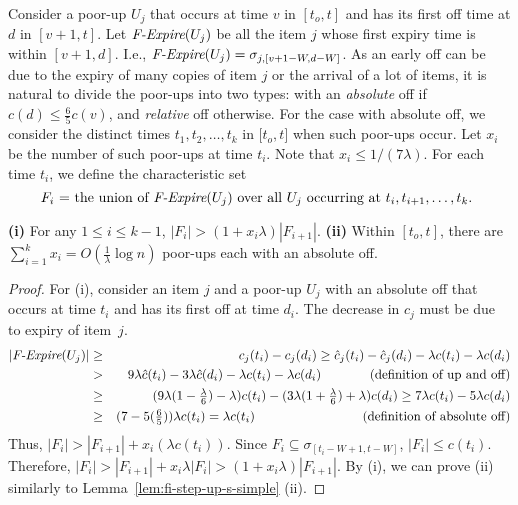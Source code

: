 \documentclass[proceedings]{stacs}
\theoremstyle{definition}\newtheorem{fact}{Fact}
\newcommand{\eif}{\mbox{\it F-Expire}}
\newcommand{\ns}{c}
\newcommand{\hns}{\hat c}
\newcommand{\cjs}{c_{j}}
\newcommand{\hcjs}{\hat c_{j}}
\begin{document}
\vspace{.5ex}
Consider a poor-up $U_j$ that occurs at time $v$ in $[t_o, t]$
and has its first off time at $d$ in $[v+1,t]$.
Let $\eif(U_j)$ be all the item $j$ whose first expiry time is
within $[v+1, d]$.  I.e.,  $\eif(U_j) = \sigma_{j,[v+1 - W, d -W]}$.
As an early off can be due to the expiry of many copies of item $j$
or the arrival of a lot of items, it is natural to divide
the poor-ups into two types:  with an \emph{absolute} off if
$\ns(d) \le \frac{6}{5} \ns(v)$, and \emph{relative} off otherwise.
For the case with absolute off, we consider
the distinct times $t_1, t_2, \dots, t_k$ in $[t_o, t$]
when such poor-ups occur.
Let $x_i$ be the number of such poor-ups at time $t_i$.
Note that $x_i \le 1 / (7 \lambda)$.
For each time $t_i$,
we define the characteristic set
$$\mbox{$F_i$ =  the union of
$\eif(U_j)$ over all $U_j$ occurring at $t_i, t_{i+1}, \dots, t_k$.
}
$$

\begin{lemma} \label{lem:fi-poor-up-s}
{\bf (i)}
For any $1 \le i \le k-1$, $|F_{i}| > (1 + x_i \lambda) |F_{i+1}|$.
{\bf (ii)}
Within $[t_o, t]$, there are $\sum_{i=1}^{k} x_i = O(
\frac{1}{\lambda} \log n )$
poor-ups each with an absolute off.
\end{lemma}

\begin{proof}
For (i),
consider an item $j$ and a poor-up $U_j$ with an absolute off that occurs at time $t_i$
and has its first off at time $d_i$.
The decrease in $\cjs$ must be due to expiry of item~$j$.
\begin{eqnarray*}
|\eif(U_j)|
& \ge & \cjs(t_i) - \cjs(d_i)
\ge \hcjs(t_i) - \hcjs(d_i) - \lambda \ns(t_i) - \lambda \ns(d_i) \\
& > & 9 \lambda \hns(t_i) - 3 \lambda \hns(d_i) - \lambda \ns(t_i) - \lambda \ns(d_i)
\hspace{.52in}\mbox{(definition of up and off)}\\
& \ge & \textstyle(9 \lambda (1 - \frac{\lambda}{6}) - \lambda)\ns(t_i)
- (3 \lambda(1 + \frac{\lambda}{6}) + \lambda) \ns(d_i)
\ge 7 \lambda \ns(t_i) - 5 \lambda \ns(d_i) \\
& \ge & \textstyle (7  - 5 (\frac{6}{5}) )\lambda \ns(t_i) = \lambda \ns(t_i)
\hspace{1.15in}\mbox{(definition of absolute off)}
\end{eqnarray*}
Thus,
$|F_{i}| > |F_{i+1}| + x_i \left(\lambda \ns(t_i)\right)$.
Since $F_i \subseteq \sigma_{[t_i - W + 1, t - W]}$,
$|F_i| \le \ns(t_i)$. Therefore,
$|F_i|
> |F_{i+1}| +  x_i \lambda |F_i|
> (1 + x_i \lambda) |F_{i+1}|$.
By (i), we can prove (ii) similarly to Lemma~\ref{lem:fi-step-up-s-simple} (ii).
\end{proof}
\end{document}

